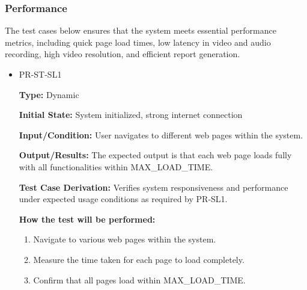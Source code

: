 \documentclass[12pt, titlepage]{article}
\begin{document}
\subsubsection{Performance}
\hspace{2em}The test cases below ensures that the system meets essential performance metrics, 
including quick page load times, low latency in video and audio recording, high video 
resolution, and efficient report generation. 

\begin{itemize}
  \item PR-ST-SL1
  \begin{mdframed}[linewidth=0.5mm]
      \textbf{Type:} Dynamic\par
      \textbf{Initial State:} System initialized, strong internet connection \par
      \textbf{Input/Condition:} User navigates to different web pages within the system. \par
      \textbf{Output/Results:} The expected output is that each web page loads fully with all functionalities within MAX\_LOAD\_TIME. \par
      \textbf{Test Case Derivation:} Verifies system responsiveness and performance under expected usage conditions as required by PR-SL1. \par
      \textbf{How the test will be performed:}
      \begin{enumerate}[noitemsep]
        \item Navigate to various web pages within the system.
        \item Measure the time taken for each page to load completely.
        \item Confirm that all pages load within MAX\_LOAD\_TIME.
      \end{enumerate}
  \end{mdframed}


\end{itemize}
\end{document}
